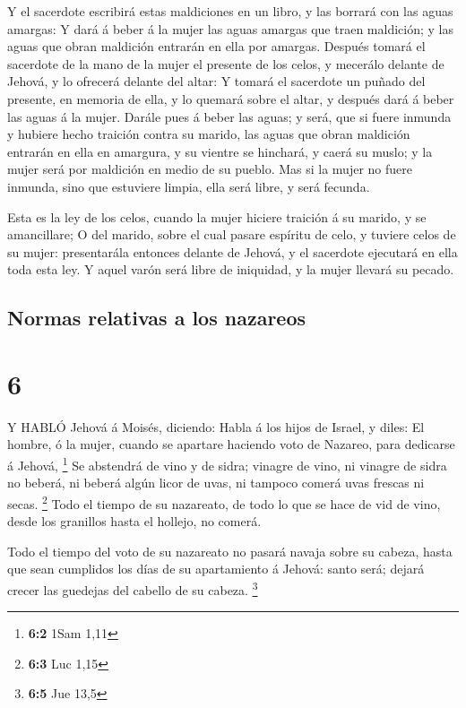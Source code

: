  Y el sacerdote escribirá estas maldiciones en un libro, y
las borrará con las aguas amargas:  Y dará á beber á la
mujer las aguas amargas que traen maldición; y las aguas que obran
maldición entrarán en ella por amargas.  Después tomará el
sacerdote de la mano de la mujer el presente de los celos, y mecerálo
delante de Jehová, y lo ofrecerá delante del altar:  Y
tomará el sacerdote un puñado del presente, en memoria de ella, y lo
quemará sobre el altar, y después dará á beber las aguas á la mujer.
 Darále pues á beber las aguas; y será, que si fuere
inmunda y hubiere hecho traición contra su marido, las aguas que obran
maldición entrarán en ella en amargura, y su vientre se hinchará, y
caerá su muslo; y la mujer será por maldición en medio de su pueblo.
 Mas si la mujer no fuere inmunda, sino que estuviere
limpia, ella será libre, y será fecunda.

 Esta es la ley de los celos, cuando la mujer hiciere
traición á su marido, y se amancillare;  O del marido,
sobre el cual pasare espíritu de celo, y tuviere celos de su mujer:
presentarála entonces delante de Jehová, y el sacerdote ejecutará en
ella toda esta ley.  Y aquel varón será libre de iniquidad,
y la mujer llevará su pecado.

\hypertarget{normas-relativas-a-los-nazareos}{%
\subsection{Normas relativas a los
nazareos}\label{normas-relativas-a-los-nazareos}}

\hypertarget{section-5}{%
\section{6}\label{section-5}}

 Y HABLÓ Jehová á Moisés, diciendo:  Habla á los
hijos de Israel, y diles: El hombre, ó la mujer, cuando se apartare
haciendo voto de Nazareo, para dedicarse á Jehová, \footnote{\textbf{6:2}
  1Sam 1,11}  Se abstendrá de vino y de sidra; vinagre de
vino, ni vinagre de sidra no beberá, ni beberá algún licor de uvas, ni
tampoco comerá uvas frescas ni secas. \footnote{\textbf{6:3} Luc 1,15}
 Todo el tiempo de su nazareato, de todo lo que se hace de
vid de vino, desde los granillos hasta el hollejo, no comerá.

 Todo el tiempo del voto de su nazareato no pasará navaja
sobre su cabeza, hasta que sean cumplidos los días de su apartamiento á
Jehová: santo será; dejará crecer las guedejas del cabello de su cabeza.
\footnote{\textbf{6:5} Jue 13,5}

